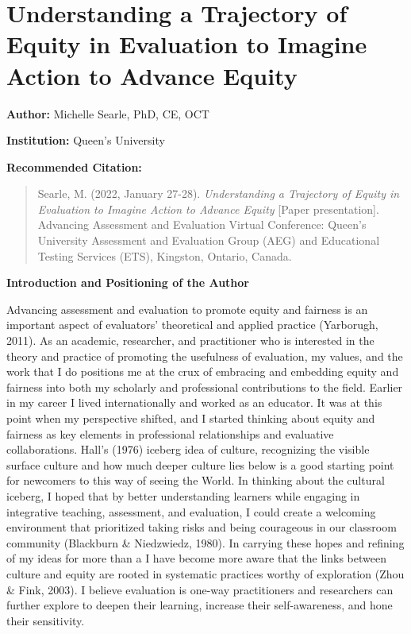 \documentclass[
]{book}
\begin{document}
\hypertarget{understanding-a-trajectory-of-equity-in-evaluation-to-imagine-action-to-advance-equity}{%
\section{Understanding a Trajectory of Equity in Evaluation to Imagine Action to Advance Equity}\label{understanding-a-trajectory-of-equity-in-evaluation-to-imagine-action-to-advance-equity}}

\textbf{Author:} Michelle Searle, PhD, CE, OCT

\textbf{Institution:} Queen's University

\textbf{Recommended Citation:}

\begin{quote}
Searle, M. (2022, January 27-28). \emph{Understanding a Trajectory of Equity in Evaluation to Imagine Action to Advance Equity} {[}Paper presentation{]}. Advancing Assessment and Evaluation Virtual Conference: Queen's University Assessment and Evaluation Group (AEG) and Educational Testing Services (ETS), Kingston, Ontario, Canada.
\end{quote}

\textbf{Introduction and Positioning of the Author}

Advancing assessment and evaluation to promote equity and fairness is an important aspect of evaluators' theoretical and applied practice (Yarborugh, 2011). As an academic, researcher, and practitioner who is interested in the theory and practice of promoting the usefulness of evaluation, my values, and the work that I do positions me at the crux of embracing and embedding equity and fairness into both my scholarly and professional contributions to the field. Earlier in my career I lived internationally and worked as an educator. It was at this point when my perspective shifted, and I started thinking about equity and fairness as key elements in professional relationships and evaluative collaborations. Hall's (1976) iceberg idea of culture, recognizing the visible surface culture and how much deeper culture lies below is a good starting point for newcomers to this way of seeing the World. In thinking about the cultural iceberg, I hoped that by better understanding learners while engaging in integrative teaching, assessment, and evaluation, I could create a welcoming environment that prioritized taking risks and being courageous in our classroom community (Blackburn \& Niedzwiedz, 1980). In carrying these hopes and refining of my ideas for more than a I have become more aware that the links between culture and equity are rooted in systematic practices worthy of exploration (Zhou \& Fink, 2003). I believe evaluation is one-way practitioners and researchers can further explore to deepen their learning, increase their self-awareness, and hone their sensitivity.
\end{document}
